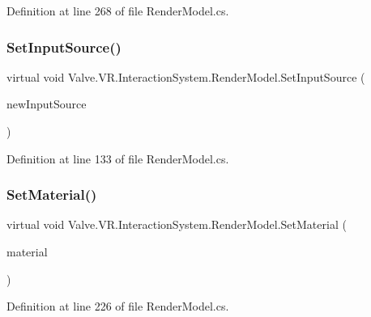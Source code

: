 Definition at line 268 of file Render\+Model.\+cs.

\mbox{\label{class_valve_1_1_v_r_1_1_interaction_system_1_1_render_model_a07fc5bd85be1388fdef18cf688e0537e}} 
\subsubsection{\texorpdfstring{SetInputSource()}{SetInputSource()}}
{\footnotesize\ttfamily virtual void Valve.\+V\+R.\+Interaction\+System.\+Render\+Model.\+Set\+Input\+Source (\begin{DoxyParamCaption}\item[{\mbox{\hyperlink{namespace_valve_1_1_v_r_a82e5bf501cc3aa155444ee3f0662853f}{Steam\+V\+R\+\_\+\+Input\+\_\+\+Sources}}}]{new\+Input\+Source }\end{DoxyParamCaption})\hspace{0.3cm}{\ttfamily [virtual]}}



Definition at line 133 of file Render\+Model.\+cs.

\mbox{\label{class_valve_1_1_v_r_1_1_interaction_system_1_1_render_model_a5248fda9972c21a590dc69126ad43116}} 
\subsubsection{\texorpdfstring{SetMaterial()}{SetMaterial()}}
{\footnotesize\ttfamily virtual void Valve.\+V\+R.\+Interaction\+System.\+Render\+Model.\+Set\+Material (\begin{DoxyParamCaption}\item[{Material}]{material }\end{DoxyParamCaption})\hspace{0.3cm}{\ttfamily [virtual]}}



Definition at line 226 of file Render\+Model.\+cs.

